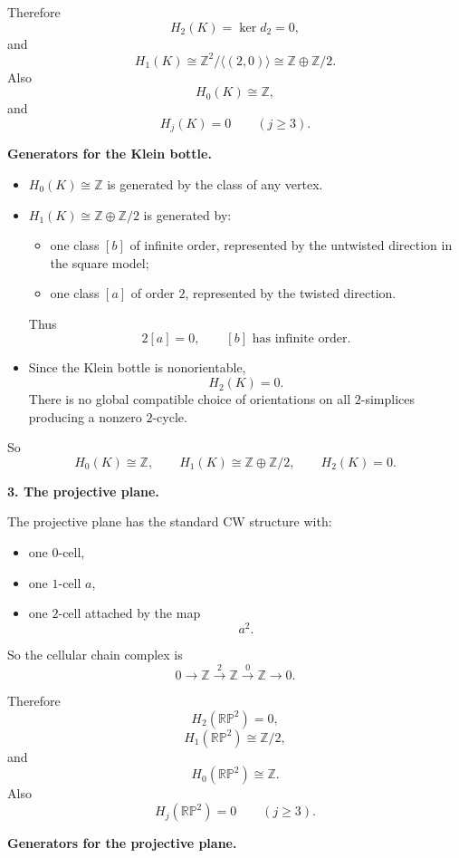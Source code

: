 \documentclass[12pt,a4paper]{article}
\theoremstyle{notespace}
\begin{document}
Therefore
\[
H_2(K)=\ker d_2=0,
\]
and
\[
H_1(K)\cong \mathbb Z^2/\langle (2,0)\rangle \cong \mathbb Z\oplus \mathbb Z/2.
\]
Also
\[
H_0(K)\cong \mathbb Z,
\]
and
\[
H_j(K)=0 \qquad (j\ge 3).
\]

\medskip

\textbf{Generators for the Klein bottle.}

\begin{itemize}
	\item \(H_0(K)\cong \mathbb Z\) is generated by the class of any vertex.
	\item \(H_1(K)\cong \mathbb Z\oplus \mathbb Z/2\) is generated by:
	\begin{itemize}
		\item one class \([b]\) of infinite order, represented by the untwisted direction in the square model;
		\item one class \([a]\) of order \(2\), represented by the twisted direction.
	\end{itemize}
	Thus
	\[
	2[a]=0,
	\qquad
	[b]\text{ has infinite order}.
	\]
	\item Since the Klein bottle is nonorientable,
	\[
	H_2(K)=0.
	\]
	There is no global compatible choice of orientations on all \(2\)-simplices producing a nonzero \(2\)-cycle.
\end{itemize}

So
\[
H_0(K)\cong \mathbb Z,\qquad
H_1(K)\cong \mathbb Z\oplus \mathbb Z/2,\qquad
H_2(K)=0.
\]

\bigskip

\textbf{3. The projective plane.}

The projective plane has the standard CW structure with:

\begin{itemize}
	\item one \(0\)-cell,
	\item one \(1\)-cell \(a\),
	\item one \(2\)-cell attached by the map
	\[
	a^2.
	\]
\end{itemize}

So the cellular chain complex is
\[
0 \longrightarrow \mathbb Z
\xrightarrow{2}
\mathbb Z
\xrightarrow{0}
\mathbb Z
\longrightarrow 0.
\]

Therefore
\[
H_2(\mathbb{RP}^2)=0,
\]
\[
H_1(\mathbb{RP}^2)\cong \mathbb Z/2,
\]
and
\[
H_0(\mathbb{RP}^2)\cong \mathbb Z.
\]
Also
\[
H_j(\mathbb{RP}^2)=0 \qquad (j\ge 3).
\]

\medskip

\textbf{Generators for the projective plane.}
\end{document}
